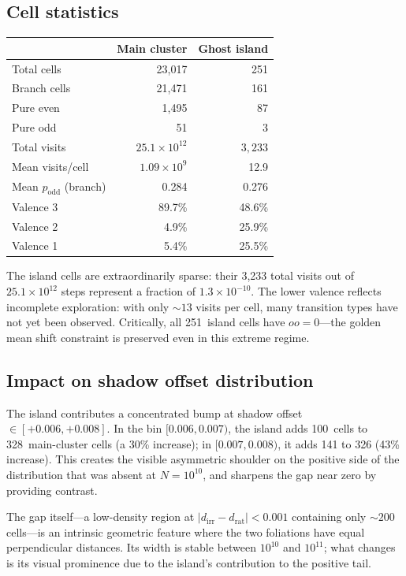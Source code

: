\documentclass[11pt]{article}
\begin{document}
\subsection{Cell statistics}

\begin{center}
\begin{tabular}{lrr}
\toprule
& Main cluster & Ghost island \\
\midrule
Total cells & 23{,}017 & 251 \\
Branch cells & 21{,}471 & 161 \\
Pure even & 1{,}495 & 87 \\
Pure odd & 51 & 3 \\
\midrule
Total visits & $25.1 \times 10^{12}$ & $3{,}233$ \\
Mean visits/cell & $1.09 \times 10^{9}$ & 12.9 \\
Mean $p_{\mathrm{odd}}$ (branch) & 0.284 & 0.276 \\
\midrule
Valence 3 & 89.7\% & 48.6\% \\
Valence 2 & 4.9\% & 25.9\% \\
Valence 1 & 5.4\% & 25.5\% \\
\bottomrule
\end{tabular}
\end{center}

The island cells are extraordinarily sparse: their 3{,}233 total
visits out of $25.1 \times 10^{12}$ steps represent a fraction of
$1.3 \times 10^{-10}$.  The lower valence reflects incomplete
exploration: with only $\sim\!13$ visits per cell, many transition
types have not yet been observed.  Critically, all 251~island cells
have $\mathit{oo} = 0$---the golden mean shift constraint is
preserved even in this extreme regime.

\subsection{Impact on shadow offset distribution}

The island contributes a concentrated bump at shadow offset
$\in [+0.006, +0.008]$.  In the bin $[0.006, 0.007)$, the island
adds 100~cells to 328~main-cluster cells (a 30\% increase); in
$[0.007, 0.008)$, it adds 141 to 326 (43\% increase).  This
creates the visible asymmetric shoulder on the positive side of
the distribution that was absent at $N = 10^{10}$, and sharpens
the gap near zero by providing contrast.

The gap itself---a low-density region at $|d_{\mathrm{irr}} -
d_{\mathrm{rat}}| < 0.001$ containing only $\sim\!200$ cells---is
an intrinsic geometric feature where the two foliations have equal
perpendicular distances.  Its width is stable between $10^{10}$
and $10^{11}$; what changes is its visual prominence due to the
island's contribution to the positive tail.
\end{document}
